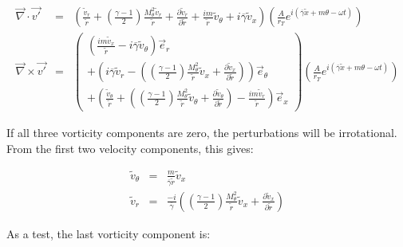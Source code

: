 \begin{eqnarray}
\vec{\nabla} \cdot \vec{v'} &=&
\left(
\frac{ \widetilde{v}_r}{\widetilde{r}}
+
\left(
\frac{\gamma-1}{2}
\right)
\frac{
M_{\theta}^2
 \widetilde{v}_r
}{\widetilde{r}}
+ \frac{\partial \widetilde{v}_r}{\partial \widetilde{r}}
+ \frac{i m}{\widetilde{r}} \widetilde{v}_{\theta}
+ i \overline{\gamma} \widetilde{v}_x
\right)
\left(
\frac{A}{r_T}
e^{i \left(\overline{\gamma} \widetilde{x} + m \theta - \omega t \right)}
\right)
\nonumber
\\
\vec{\nabla} \times \vec{v'}
&=&
\left(
\begin{array}{r}
\left(
\frac{i m \widetilde{v}_x}{\widetilde{r}}
-
i \overline{\gamma} \widetilde{v}_{\theta}
\right) \vec{e}_r
\\
+\left(
i \overline{\gamma} \widetilde{v}_r
-
\left(
\left(\frac{\gamma-1}{2} \right)
\frac{M_{\theta}^2}{\widetilde{r}}
\widetilde{v}_x
+
\frac{\partial \widetilde{v}_x}{\partial \widetilde{r}} 
\right)
\right) \vec{e}_{\theta}
\\
+
\left(
\frac{  \widetilde{v}_{\theta}}{\widetilde{r}}
+ 
\left(
\left(\frac{\gamma-1}{2} \right)
\frac{M_{\theta}^2}{\widetilde{r}}
\widetilde{v}_{\theta}
+
\frac{\partial \widetilde{v}_{\theta}}{\partial \widetilde{r}} 
\right)
-\frac{i m \widetilde{v}_r}{\widetilde{r}}
\right) \vec{e}_x
\end{array}
\right)
\left(
\frac{A}{r_T}
e^{i \left(\overline{\gamma} \widetilde{x} + m \theta - \omega t \right)}
\right)
\nonumber
\end{eqnarray}

If all three vorticity components are zero, the perturbations will
be irrotational.  From the first two velocity components, this gives:

\begin{eqnarray}
\widetilde{v}_{\theta}
&=&
\frac{m}{\overline{\gamma} \widetilde{r}} \widetilde{v}_{x}
\nonumber
\\
\widetilde{v}_r
&=&
\frac{-i}{ \overline{\gamma}}
\left(
\left(\frac{\gamma-1}{2} \right)
\frac{M_{\theta}^2}{\widetilde{r}}
\widetilde{v}_x
+
\frac{\partial \widetilde{v}_x}{\partial \widetilde{r}} 
\right)
\nonumber
\end{eqnarray}

As a test, the last vorticity component is:

